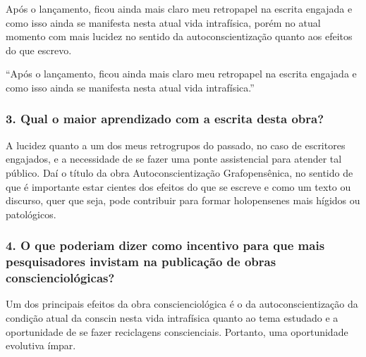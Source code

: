 \documentclass{gescons}
\begin{document}
\begin{multicols}{2}
Após o lançamento, ficou ainda mais claro meu retropapel na escrita
engajada e como isso ainda se manifesta nesta atual vida intrafísica,
porém no atual momento com mais lucidez no sentido da
autoconscientização quanto aos efeitos do que escrevo.

\begin{pullquote}
``Após o lançamento, ficou ainda mais claro meu retropapel na escrita engajada e como isso ainda se manifesta nesta atual vida intrafísica.''
\end{pullquote}

\subsubsection{3. Qual o maior aprendizado com a escrita desta obra?}

A lucidez quanto a um dos meus retrogrupos do passado, no caso de
escritores engajados, e a necessidade de se fazer uma ponte assistencial
para atender tal público. Daí o título da obra Autoconscientização
Grafopensênica, no sentido de que é importante estar cientes dos efeitos
do que se escreve e como um texto ou discurso, quer que seja, pode
contribuir para formar holopensenes mais hígidos ou patológicos.

\subsubsection{4. O que poderiam dizer como incentivo para que mais pesquisadores invistam na publicação de obras conscienciológicas?}

Um dos principais efeitos da obra conscienciológica é o da
autoconscientização da condição atual da conscin nesta vida intrafísica
quanto ao tema estudado e a oportunidade de se fazer reciclagens
conscienciais. Portanto, uma oportunidade evolutiva ímpar.

    
    \end{multicols}
\end{document}
